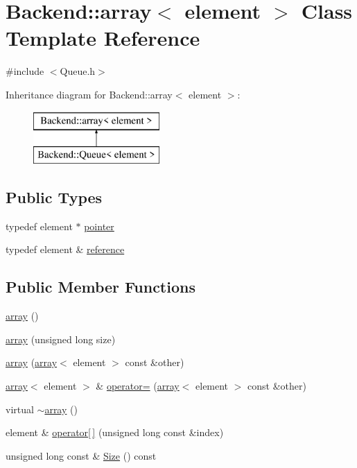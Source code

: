 \hypertarget{classBackend_1_1array}{\section{Backend\+:\+:array$<$ element $>$ Class Template Reference}
\label{classBackend_1_1array}
}


{\ttfamily \#include $<$Queue.\+h$>$}

Inheritance diagram for Backend\+:\+:array$<$ element $>$\+:\begin{figure}[H]
\begin{center}
\leavevmode
\includegraphics[height=2.000000cm]{classBackend_1_1array}
\end{center}
\end{figure}
\subsection*{Public Types}
\begin{DoxyCompactItemize}
\item 
typedef element $\ast$ \hyperlink{classBackend_1_1array_a6d8785dc8b979153ef122f4e3bad1408}{pointer}
\item 
typedef element \& \hyperlink{classBackend_1_1array_aa98075b8d7a4e63ea919ee9d1d4df4a9}{reference}
\end{DoxyCompactItemize}
\subsection*{Public Member Functions}
\begin{DoxyCompactItemize}
\item 
\hyperlink{classBackend_1_1array_a66b527d78881f22d8b8508492f255122}{array} ()
\item 
\hyperlink{classBackend_1_1array_aea145bb4183732b07f1ea2c5ef74406e}{array} (unsigned long size)
\item 
\hyperlink{classBackend_1_1array_ac15cb5df923a27aae58573b2a798a564}{array} (\hyperlink{classBackend_1_1array}{array}$<$ element $>$ const \&other)
\item 
\hyperlink{classBackend_1_1array}{array}$<$ element $>$ \& \hyperlink{classBackend_1_1array_abab978602a61af66f73e4951e5779554}{operator=} (\hyperlink{classBackend_1_1array}{array}$<$ element $>$ const \&other)
\item 
virtual \hyperlink{classBackend_1_1array_af036a9cb5baeb7acdda453ffc25e8b5f}{$\sim$array} ()
\item 
element \& \hyperlink{classBackend_1_1array_a906073a0b37d9abef728f2c188e73a5a}{operator\mbox{[}$\,$\mbox{]}} (unsigned long const \&index)
\item 
unsigned long const \& \hyperlink{classBackend_1_1array_a7b74d2da9eacbeea96b1661962a03970}{Size} () const 
\end{DoxyCompactItemize}
